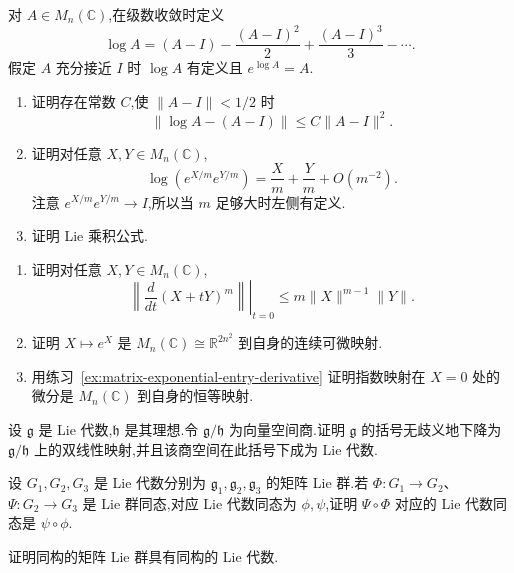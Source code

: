 {\begin{exercise}\label{ex:lie-product-formula}
对 $A\in M_n(\mathbb C)$,在级数收敛时定义
\[
\log A=(A-I)-\frac{(A-I)^2}{2}+\frac{(A-I)^3}{3}-\cdots.
\]
假定 $A$ 充分接近 $I$ 时 $\log A$ 有定义且 $e^{\log A}=A$.
\begin{enumerate}
\item 证明存在常数 $C$,使 $\|A-I\|<1/2$ 时
\[
\|\log A-(A-I)\|\leq C\|A-I\|^2.
\]
\item 证明对任意 $X,Y\in M_n(\mathbb C)$,
\[
\log(e^{X/m}e^{Y/m})=\frac Xm+\frac Ym+O(m^{-2}).
\]
注意 $e^{X/m}e^{Y/m}\to I$,所以当 $m$ 足够大时左侧有定义.
\item 证明 Lie 乘积公式.
\end{enumerate}
\end{exercise}

\begin{exercise}[指数映射的微分]\label{ex:exponential-differential-at-zero}
\begin{enumerate}
\item 证明对任意 $X,Y\in M_n(\mathbb C)$,
\[
\left.\left\|\frac{d}{dt}(X+tY)^m\right\|\right|_{t=0}
\leq m\|X\|^{m-1}\|Y\|.
\]
\item 证明 $X\mapsto e^X$ 是 $M_n(\mathbb C)\cong\mathbb R^{2n^2}$ 到自身的连续可微映射.
\item 用练习~\ref{ex:matrix-exponential-entry-derivative} 证明指数映射在 $X=0$ 处的微分是 $M_n(\mathbb C)$ 到自身的恒等映射.
\end{enumerate}
\end{exercise}

\begin{exercise}[商 Lie 代数]\label{ex:lie-algebra-quotient}
设 $\mathfrak g$ 是 Lie 代数,$\mathfrak h$ 是其理想.令 $\mathfrak g/\mathfrak h$ 为向量空间商.证明 $\mathfrak g$ 的括号无歧义地下降为 $\mathfrak g/\mathfrak h$ 上的双线性映射,并且该商空间在此括号下成为 Lie 代数.
\end{exercise}

\begin{exercise}\label{ex:composition-lie-homomorphisms}
设 $G_1,G_2,G_3$ 是 Lie 代数分别为 $\mathfrak g_1,\mathfrak g_2,\mathfrak g_3$ 的矩阵 Lie 群.若 $\Phi:G_1\to G_2$、$\Psi:G_2\to G_3$ 是 Lie 群同态,对应 Lie 代数同态为 $\phi,\psi$,证明 $\Psi\circ\Phi$ 对应的 Lie 代数同态是 $\psi\circ\phi$.
\end{exercise}

\begin{exercise}\label{ex:lie-isomorphic-algebras}
证明同构的矩阵 Lie 群具有同构的 Lie 代数.
\end{exercise}

}

